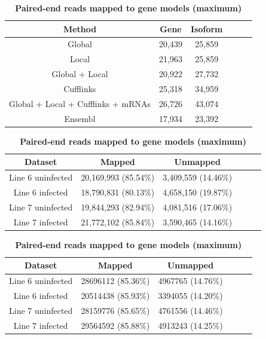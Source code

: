 \documentclass[10pt]{article}
\begin{document}
\begin{table}[!ht]
\caption{
\bf{Number of putative genes and isoforms}}
\begin{tabular}{cccccc}
\hline
Method& Gene & Isoform \\ 
\hline
Global & 20,439 & 25,859 \\
Local & 21,963 & 25,859 \\
Global + Local & 20,922 & 27,732 \\
Cufflinks & 25,318 & 34,959 \\
Global + Local + Cufflinks + mRNAs & 26,726 & 43,074\\
Ensembl & 17,934 & 23,392 \\
\hline
\end{tabular}
\label{genes_transcripts}

\caption{
\bf{Single-end reads mapped to gene models (maximum)}}
\begin{tabular}{cccccc}
\hline
Dataset & Mapped & Unmapped \\
\hline
Line 6 uninfected & 20,169,993 (85.54\%) & 3,409,559 (14.46\%) \\
Line 6 infected & 18,790,831 (80.13\%) & 4,658,150 (19.87\%) \\
Line 7 uninfected & 19,844,293 (82.94\%) & 4,081,516 (17.06\%) \\
Line 7 infected & 21,772,102 (85.84\%) & 3,590,465 (14.16\%) \\
\hline
\end{tabular}
\label{single-end_map}

\caption{
\bf{Paired-end reads mapped to gene models (maximum)}}
\begin{tabular}{cccccc}
\hline
Dataset & Mapped & Unmapped \\
\hline
Line 6 uninfected & 28696112 (85.36\%) & 4967765 (14.76\%) \\
Line 6 infected & 20514438 (85.93\%) & 3394055 (14.20\%) \\
Line 7 uninfected & 28159776 (85.65\%) & 4761556 (14.46\%) \\
Line 7 infected & 29564592 (85.88\%) & 4913243 (14.25\%) \\
\hline
\end{tabular}
\label{paired-end_map}
\end{table}
\end{document}
